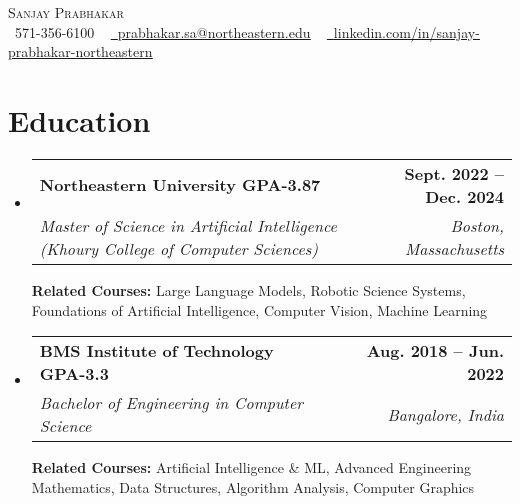 \documentclass[letterpaper,11pt]{article}
\makeatletter
\newcommand{\resumeSubheading}[4]{
  \vspace{-2pt}\item
    \begin{tabular*}{1.0\textwidth}[t]{l@{\extracolsep{\fill}}r}
      \textbf{#1} & \textbf{\small #2} \\
      \textit{\small#3} & \textit{\small #4} \\
    \end{tabular*}\vspace{-7pt}
}
\newcommand{\resumeSubHeadingListStart}{\begin{itemize}[leftmargin=0.0in, label={}]}
\newcommand{\resumeSubHeadingListEnd}{\end{itemize}}
\makeatother
\begin{document}

\begin{center}
    {\Huge \scshape Sanjay Prabhakar} \\ \vspace{1pt}
    \small \raisebox{-0.1\height}\faPhone\ 571-356-6100 ~ \href{mailto:prabhakar.sa@northeastern.edu}{\raisebox{-0.2\height}\faEnvelope\  \underline{prabhakar.sa@northeastern.edu}} ~ 
    \href{https://linkedin.com/in/sanjay-prabhakar-northeastern}{\raisebox{-0.2\height}\faLinkedin\ \underline{linkedin.com/in/sanjay-prabhakar-northeastern}}  ~
    \vspace{-8pt}
\end{center}


\section{Education}
  \resumeSubHeadingListStart
    \resumeSubheading
      {Northeastern University  \hspace{230pt} GPA-3.87}{Sept. 2022 -- Dec. 2024}
      {Master of Science in Artificial Intelligence (Khoury College of Computer Sciences)}{Boston, Massachusetts}
      {\newline \textbf{Related Courses:} Large Language Models, Robotic Science Systems, Foundations of Artificial Intelligence, Computer Vision, Machine Learning}
      
    \resumeSubheading
      {BMS Institute of Technology\hspace{210pt} GPA-3.3}{Aug. 2018 -- Jun. 2022}
      {Bachelor of Engineering in Computer Science}{Bangalore, India}
      {\newline \textbf{Related Courses:} Artificial Intelligence \& ML, Advanced Engineering Mathematics, Data Structures, Algorithm Analysis, Computer Graphics}
      
  \resumeSubHeadingListEnd
\end{document}
